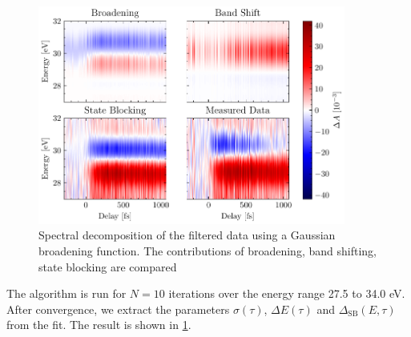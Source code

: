 \begin{figure}
	\centering
	\includegraphics[width=0.9\textwidth]{figures/chap4/OD_df_125Hz_Delay1-6_gaussian_fit_result.pdf}
	\caption{Spectral decomposition of the filtered data using a Gaussian broadening function. The contributions of broadening, band shifting, state blocking are compared }
	\label{fig:OD_df_125Hz_Delay1-6_gaussian_fit_result}
\end{figure}

The algorithm is run for $N=10$ iterations over the energy range 27.5 to 34.0 eV. After convergence, we extract the parameters $\sigma(\tau)$, $\Delta E(\tau)$ and $\Delta_{\textrm{SB}}(E,\tau)$ from the fit. The result is shown in \cref{fig:OD_df_125Hz_Delay1-6_gaussian_fit_result}.

